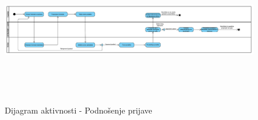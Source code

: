 \begin{figure}[H]
  \begin{center}
      \includegraphics[width = 140mm, height=65mm]{Diagrams/dijagram_aktivnosti_podnosenje_prijave.png}
  \end{center}
  \caption {Dijagram aktivnosti - Podnošenje prijave}
  \label{activity_podnosenje_prijave}

\end{figure}
\newpage



